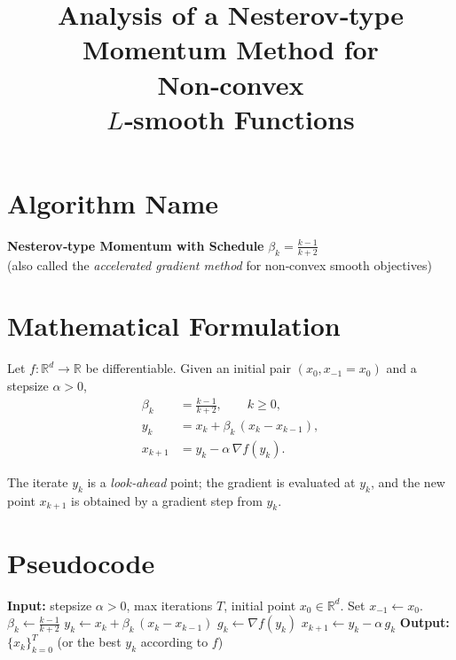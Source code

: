 \documentclass{article}
\title{Analysis of a Nesterov‑type Momentum Method for Non‑convex \\ $L$‑smooth Functions}
\author{}
\date{}
\newcommand{\grad}{\nabla}
\begin{document}
\maketitle

\section*{Algorithm Name}
\textbf{Nesterov‑type Momentum with Schedule }$\displaystyle\beta_k=\frac{k-1}{k+2}$\\
(also called the \emph{accelerated gradient method} for non‑convex smooth objectives)

\section*{Mathematical Formulation}
Let $f:\mathbb{R}^d\rightarrow\mathbb{R}$ be differentiable.  
Given an initial pair $(x_{0},x_{-1}=x_{0})$ and a stepsize $\alpha>0$,
\[
\boxed{
\begin{aligned}
\beta_k &= \frac{k-1}{k+2},\qquad k\ge 0,\\[2mm]
y_k    &= x_k+\beta_k\,(x_k-x_{k-1}),\\[2mm]
x_{k+1}&= y_k-\alpha\,\grad f(y_k).
\end{aligned}}
\tag{1}
\]

The iterate $y_k$ is a \emph{look‑ahead} point; the gradient is evaluated at $y_k$,
and the new point $x_{k+1}$ is obtained by a gradient step from $y_k$.

\section*{Pseudocode}
\begin{algorithm}[H]
\caption{Nesterov‑type Momentum (β‑schedule $\frac{k-1}{k+2}$)}
\begin{algorithmic}[1]
\STATE \textbf{Input:} stepsize $\alpha>0$, max iterations $T$,
\STATE \hspace{1.2cm}initial point $x_0\in\mathbb{R}^d$.
\STATE Set $x_{-1}\gets x_0$.
    \STATE $\displaystyle \beta_k\gets\frac{k-1}{k+2}$ 
    \STATE $y_k\gets x_k+\beta_k\,(x_k-x_{k-1})$ 
    \STATE $g_k\gets \grad f(y_k)$ 
    \STATE $x_{k+1}\gets y_k-\alpha\,g_k$ 
\ENDFOR
\STATE \textbf{Output:} $\{x_k\}_{k=0}^T$ (or the best $y_k$ according to $f$)
\end{algorithmic}
\end{algorithm}
\end{document}
